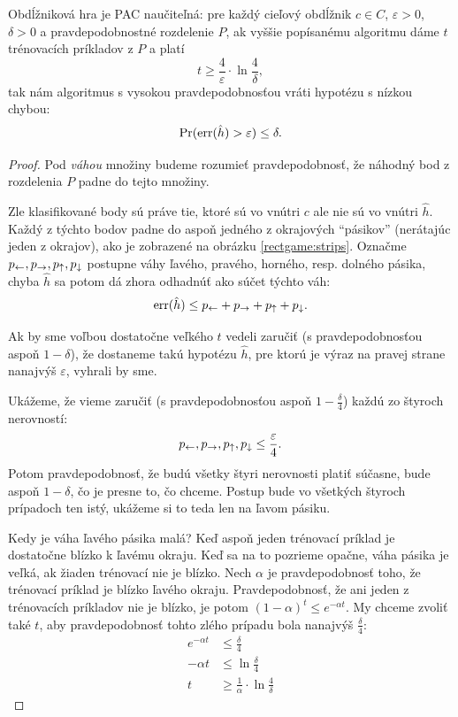 \begin{theorem}
  Obdĺžniková hra je PAC naučiteľná: pre každý cieľový obdĺžnik $c \in C$,
  $\varepsilon > 0$, $\delta > 0$ a pravdepodobnostné rozdelenie $P$, ak
  vyššie popísanému algoritmu dáme $t$ trénovacích príkladov z $P$ a
  platí
  $$ t \geq \frac{4}{\varepsilon} \cdot \ln{\frac{4}{\delta}}, $$
  tak nám algoritmus s vysokou pravdepodobnosťou vráti hypotézu s nízkou
  chybou:
  $$ \operatorname*{\mathrm{Pr}}(\mathrm{err}(\hat{h}) > \varepsilon) \leq \delta. $$
\end{theorem}
\begin{proof}
  Pod \emph{váhou} množiny budeme rozumieť pravdepodobnosť, že náhodný
  bod z rozdelenia $P$ padne do tejto množiny.
  
  Zle klasifikované body sú práve tie, ktoré sú vo vnútri $c$ ale nie sú
  vo vnútri $\hat{h}$. Každý z týchto bodov padne do aspoň jedného
  z okrajových ``pásikov'' (nerátajúc jeden z okrajov), ako je
  zobrazené na obrázku \ref{rectgame:strips}.
  Označme $p_\leftarrow, p_\rightarrow, p_\uparrow, p_\downarrow$ postupne váhy ľavého,
  pravého, horného, resp. dolného pásika, chyba $\hat{h}$ sa potom dá
  zhora odhadnúť ako súčet týchto váh:
  $$ \mathrm{err}(\hat{h}) \leq p_\leftarrow + p_\rightarrow + p_\uparrow + p_\downarrow. $$
  
  Ak by sme voľbou dostatočne veľkého $t$ vedeli zaručiť
  (s pravdepodobnosťou aspoň $1 - \delta$), že dostaneme takú hypotézu
  $\hat{h}$, pre ktorú je výraz na pravej strane nanajvýš $\varepsilon$,
  vyhrali by sme.
  
  Ukážeme, že vieme zaručiť (s pravdepodobnosťou aspoň $1 - \frac{\delta}{4}$)
  každú zo štyroch nerovností:
  $$ p_\leftarrow, p_\rightarrow, p_\uparrow, p_\downarrow \leq \frac{\varepsilon}{4}. $$
  Potom pravdepodobnosť, že budú všetky štyri nerovnosti platiť súčasne,
  bude aspoň $1 - \delta$, čo je presne to, čo chceme. Postup bude vo
  všetkých štyroch prípadoch ten istý, ukážeme si to teda len na ľavom pásiku.
  
  Kedy je váha ľavého pásika malá? Keď aspoň
  jeden trénovací príklad je dostatočne blízko k ľavému okraju. Keď sa
  na to pozrieme opačne, váha pásika je veľká, ak žiaden trénovací
  nie je blízko.
  Nech $\alpha$ je pravdepodobnosť toho, že trénovací príklad je blízko
  ľavého okraju. Pravdepodobnosť, že ani jeden z trénovacích príkladov
  nie je blízko, je potom $(1 - \alpha)^t \leq e^{-\alpha t}$. My chceme
  zvoliť také $t$, aby pravdepodobnosť tohto zlého prípadu bola nanajvýš
  $\frac{\delta}{4}$:
  \begin{align}
    e^{-\alpha t} &\leq \frac{\delta}{4} \\
    -\alpha t &\leq \ln{\frac{\delta}{4}} \\
    t &\geq \frac{1}{\alpha} \cdot \ln{\frac{4}{\delta}}
  \end{align}
  

\end{proof}
